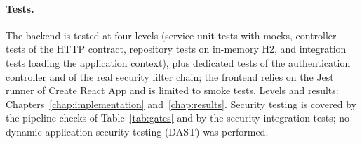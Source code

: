 \paragraph{Tests.} The backend is tested at four levels (service unit tests with mocks, controller tests of the HTTP contract, repository tests on in-memory H2, and integration tests loading the application context), plus dedicated tests of the authentication controller and of the real security filter chain; the frontend relies on the Jest runner of Create React App and is limited to smoke tests. Levels and results: Chapters~\ref{chap:implementation} and~\ref{chap:results}. Security testing is covered by the pipeline checks of Table~\ref{tab:gates} and by the security integration tests; no dynamic application security testing (DAST) was performed.
